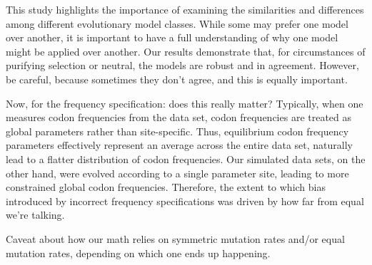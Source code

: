 \documentclass[11pt]{article}
\begin{document}
This study highlights the importance of examining the similarities and differences among different evolutionary model classes. While some may prefer one model over another, it is important to have a full understanding of why one model might be applied over another. Our results demonstrate that, for circumstances of purifying selection or neutral, the models are robust and in agreement. However, be careful, because sometimes they don't agree, and this is equally important.


Now, for the frequency specification: does this really matter? Typically, when one measures codon frequencies from the data set, codon frequencies are treated as global parameters rather than site-specific. Thus, equilibrium codon frequency parameters effectively represent an average across the entire data set, naturally lead to a flatter distribution of codon frequencies. Our simulated data sets, on the other hand, were evolved according to a single parameter site, leading to more constrained global codon frequencies. Therefore, the extent to which bias introduced by incorrect frequency specifications was driven by how far from equal we're talking.

Caveat about how our math relies on symmetric mutation rates and/or equal mutation rates, depending on which one ends up happening.
	



\end{document}
